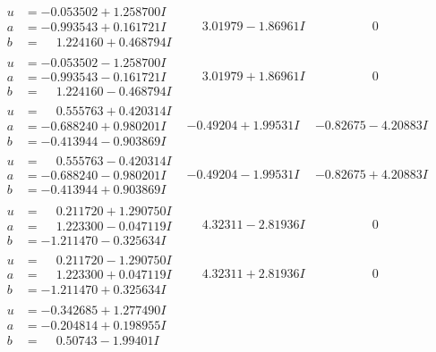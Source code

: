 \documentclass[1p]{elsarticle_modified}
\theoremstyle{definition}
\begin{document}
$$\begin{array}{c|c|c}
\begin{aligned}
u &= -0.053502 + 1.258700 I \\
a &= -0.993543 + 0.161721 I \\
b &= \phantom{-}1.224160 + 0.468794 I\end{aligned}
 & \phantom{-}3.01979 - 1.86961 I & \phantom{-0.000000 } 0 \\ \hline\begin{aligned}
u &= -0.053502 - 1.258700 I \\
a &= -0.993543 - 0.161721 I \\
b &= \phantom{-}1.224160 - 0.468794 I\end{aligned}
 & \phantom{-}3.01979 + 1.86961 I & \phantom{-0.000000 } 0 \\ \hline\begin{aligned}
u &= \phantom{-}0.555763 + 0.420314 I \\
a &= -0.688240 + 0.980201 I \\
b &= -0.413944 - 0.903869 I\end{aligned}
 & -0.49204 + 1.99531 I & -0.82675 - 4.20883 I \\ \hline\begin{aligned}
u &= \phantom{-}0.555763 - 0.420314 I \\
a &= -0.688240 - 0.980201 I \\
b &= -0.413944 + 0.903869 I\end{aligned}
 & -0.49204 - 1.99531 I & -0.82675 + 4.20883 I \\ \hline\begin{aligned}
u &= \phantom{-}0.211720 + 1.290750 I \\
a &= \phantom{-}1.223300 - 0.047119 I \\
b &= -1.211470 - 0.325634 I\end{aligned}
 & \phantom{-}4.32311 - 2.81936 I & \phantom{-0.000000 } 0 \\ \hline\begin{aligned}
u &= \phantom{-}0.211720 - 1.290750 I \\
a &= \phantom{-}1.223300 + 0.047119 I \\
b &= -1.211470 + 0.325634 I\end{aligned}
 & \phantom{-}4.32311 + 2.81936 I & \phantom{-0.000000 } 0 \\ \hline\begin{aligned}
u &= -0.342685 + 1.277490 I \\
a &= -0.204814 + 0.198955 I \\
b &= \phantom{-}0.50743 - 1.99401 I\end{aligned}

\end{array}$$
\end{document}
